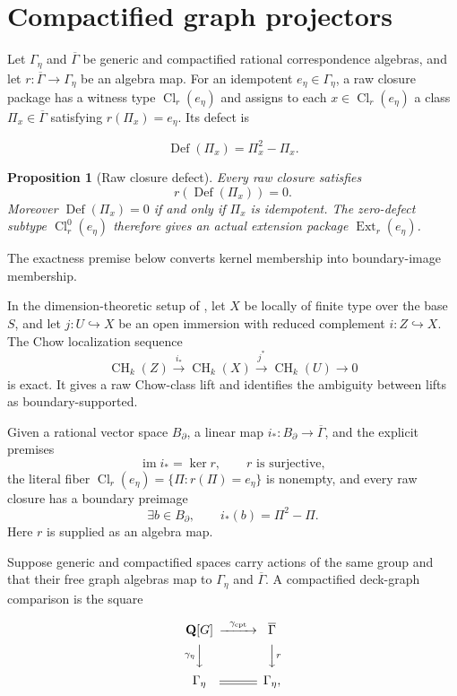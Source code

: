 \documentclass[11pt]{article}
\newtheorem{proposition}[theorem]{Proposition}
\theoremstyle{definition}
\theoremstyle{remark}
\DeclareMathOperator{\CH}{CH}
\DeclareMathOperator{\Ext}{Ext}
\DeclareMathOperator{\Cl}{Cl}
\DeclareMathOperator{\Def}{Def}
\newcommand{\Q}{\mathbf Q}
\newcommand{\Geta}{\Gamma_{\eta}}
\newcommand{\Gbar}{\overline{\Gamma}}
\begin{document}
\section{Compactified graph projectors}
\label{sec:compactification}

Let \(\Geta\) and \(\Gbar\) be generic and compactified rational
correspondence algebras, and let \(r:\Gbar\to\Geta\) be an algebra map.  For
an idempotent \(e_\eta\in\Geta\), a raw closure package has a witness type
\(\Cl_r(e_\eta)\) and assigns to each \(x\in\Cl_r(e_\eta)\) a class
\(\Pi_x\in\Gbar\) satisfying \(r(\Pi_x)=e_\eta\).  Its defect is

\[
  \Def(\Pi_x)=\Pi_x^2-\Pi_x.
\]

\begin{proposition}[Raw closure defect]
\label{prop:raw-defect}
Every raw closure satisfies
\[
  r(\Def(\Pi_x))=0.
\]
Moreover \(\Def(\Pi_x)=0\) if and only if \(\Pi_x\) is idempotent.  The
zero-defect subtype \(\Cl_r^0(e_\eta)\) therefore gives an actual extension
package \(\Ext_r(e_\eta)\).
\end{proposition}

The exactness premise below converts kernel membership into
boundary-image membership.

In the dimension-theoretic setup of \cite{StacksChowLocalization}, let
\(X\) be locally of finite type over the base \(S\), and let
\(j:U\hookrightarrow X\) be an open immersion with reduced complement
\(i:Z\hookrightarrow X\). The Chow localization sequence
\[
  \CH_k(Z)\xrightarrow{i_*}\CH_k(X)
    \xrightarrow{j^*}\CH_k(U)\longrightarrow0
\]
is exact. It gives a raw Chow-class lift and identifies the ambiguity
between lifts as boundary-supported.

Given a rational vector space \(B_\partial\), a linear map
\(i_*:B_\partial\to\Gbar\), and the explicit premises
\[
  \operatorname{im}i_*=\ker r,
  \qquad r\text{ is surjective},
\]
the literal fiber \(\Cl_r(e_\eta)=\{\Pi:r(\Pi)=e_\eta\}\) is nonempty,
and every raw closure has a boundary preimage
\[
  \exists b\in B_\partial,\qquad i_*(b)=\Pi^2-\Pi.
\]
Here \(r\) is supplied as an algebra map.

Suppose generic and
compactified spaces carry actions of the same group and that their free graph
algebras map to \(\Geta\) and \(\Gbar\).  A compactified deck-graph
comparison is the square

\[
\begin{CD}
  \Q[G] @>{\gamma_{\mathrm{cpt}}}>> \Gbar\\
  @V{\gamma_\eta}VV @VV{r}V\\
  \Geta @= \Geta,
\end{CD}
\]
\end{document}
